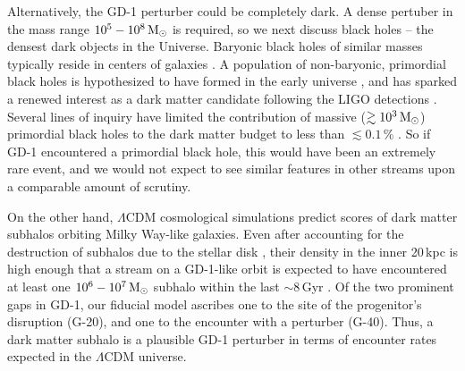 \documentclass[twocolumn]{aastex62}
\begin{document}
Alternatively, the GD-1 perturber could be completely dark.
A dense pertuber in the mass range $10^5-10^8\,\rm M_\odot$ is required, so we next discuss black holes -- the densest dark objects in the Universe.
Baryonic black holes of similar masses typically reside in centers of galaxies \citep[the mass of Milky Way's supermassive black hole, Sgr A$^\star$, is $\approx4\times10^6\,\rm M_\odot$][]{boehle2016}.
A population of non-baryonic, primordial black holes is hypothesized to have formed in the early universe \citep{carr1974}, and has sparked a renewed interest as a dark matter candidate following the LIGO detections \citep{bird2016}.
Several lines of inquiry have limited the contribution of massive ($\gtrsim10^3\,\rm M_\odot$) primordial black holes to the dark matter budget to less than $\lesssim0.1\,\%$ \citep[and references within]{carr2016}.
So if GD-1 encountered a primordial black hole, this would have been an extremely rare event, and we would not expect to see similar features in other streams upon a comparable amount of scrutiny.

On the other hand, $\Lambda$CDM cosmological simulations predict scores of dark matter subhalos orbiting Milky Way-like galaxies.
Even after accounting for the destruction of subhalos due to the stellar disk \citep{donghia2010,errani2017,gk2017}, their density in the inner 20\,kpc is high enough that a stream on a GD-1-like orbit is expected to have encountered at least one $10^6-10^7\rm\, M_\odot$ subhalo within the last $\sim8$\,Gyr \citep{erkal2016}.
Of the two prominent gaps in GD-1, our fiducial model ascribes one to the site of the progenitor's disruption (G-20), and one to the encounter with a perturber (G-40).
Thus, a dark matter subhalo is a plausible GD-1 perturber in terms of encounter rates expected in the $\Lambda$CDM universe.
\end{document}
